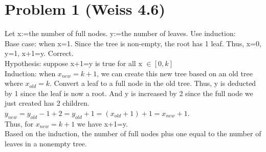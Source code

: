 \documentclass{homework}
\begin{document}
\maketitle 

\section*{Problem 1 (Weiss 4.6)}
Let x:=the number of full nodes. y:=the number of leaves. Use induction:\\
Base case: when x=1. Since the tree is non-empty, the root has 1 leaf.  Thus, x=0, y=1, x+1=y. Correct.\\
Hypothesis: suppose x+1=y is true for all x $\in [0, k]$\\
Induction: when $x_{new}=k+1$, we can create this new tree based on an old tree where $x_{old}=k$. Convert a leaf to a full node in the old tree. Thus, y is deducted by 1 since the leaf is now a root. And y is increased by 2 since the full node we just created has 2 children.\\ $y_{new} = y_{old} - 1 +2 =y_{old}+1 = (x_{old} +1)+1 = x_{new}+1$. \\Thus, for $x_{new} = k+1$ we have x+1=y. \\
Based on the induction, the number of full nodes plus one equal to the number of leaves in a nonempty tree.
\end{document}
